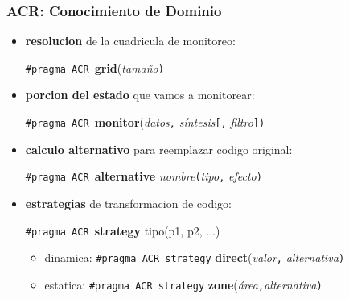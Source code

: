 \documentclass{beamer}\usetheme{Madrid} %
\begin{document}
\begin{frame}[fragile]
\frametitle{ACR: Conocimiento de Dominio}
\begin{itemize}
\item \textbf{resolucion} de la cuadricula de monitoreo:
\begin{block}{}\lstinline{#pragma ACR }\textbf{grid}(\textit{tamaño}\lstinline{)}\end{block}
\item \textbf{porcion del estado} que vamos a monitorear:
\begin{block}{}\lstinline{#pragma ACR }\textbf{monitor}(\textit{datos}\lstinline{,} \textit{síntesis}\lstinline{[,} \textit{filtro}\lstinline{])} \end{block}
\item \textbf{calculo alternativo} para reemplazar codigo original: 
\begin{block}{}\lstinline{#pragma ACR }\textbf{alternative} \textit{nombre}\lstinline{(}\textit{tipo}\lstinline{,} \textit{efecto}\lstinline{)} \end{block}
\item \textbf{estrategias} de transformacion de codigo:
\begin{block}{}\lstinline{#pragma ACR }\textbf{strategy} tipo(p1, p2, ...) 
\begin{itemize}
\item dinamica: \lstinline{#pragma ACR strategy} \textbf{direct}(\textit{valor}\lstinline{,} \textit{alternativa}\lstinline{)} 
\item estatica: \lstinline{#pragma ACR strategy} \textbf{zone}(\textit{área}\lstinline{,}\textit{alternativa}\lstinline{)}
\end{itemize}
\end{block}
\end{itemize}
\end{frame}
\end{document}
